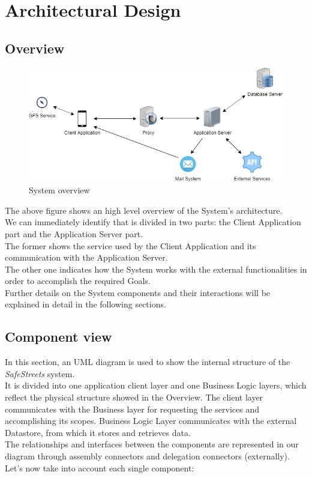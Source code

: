 \section{Architectural Design}

\subsection{Overview}
\begin{figure}[H]
          \includegraphics[scale=0.54,left]{Images/overview.png}
        \caption{System overview}
\end{figure}
The above figure shows an high level overview of the System's architecture.\\
We can immediately identify that is divided in two parts: the Client Application part and the Application Server part.\\
The former shows the service used by the Client Application and its communication with the Application Server.\\
The other one indicates how the System works with the external functionalities in order to accomplish the required Goals.\\
Further details on the System components and their interactions will be explained in detail in the following sections.

\subsection{Component view}
In this section, an UML diagram is used to show the internal structure of the \textit{SafeStreets} system. \\
It is divided into one application client layer and one Business Logic layers, which reflect the physical structure showed in the Overview.
The client layer communicates with the Business layer for requesting the services and accomplishing its scopes. 
Business Logic Layer communicates with the external Datastore, from which it stores and retrieves data. \\
The relationships and interfaces between the components are represented in our diagram through assembly connectors and delegation connectors (externally).
Let's now take into account each single component:\newline

